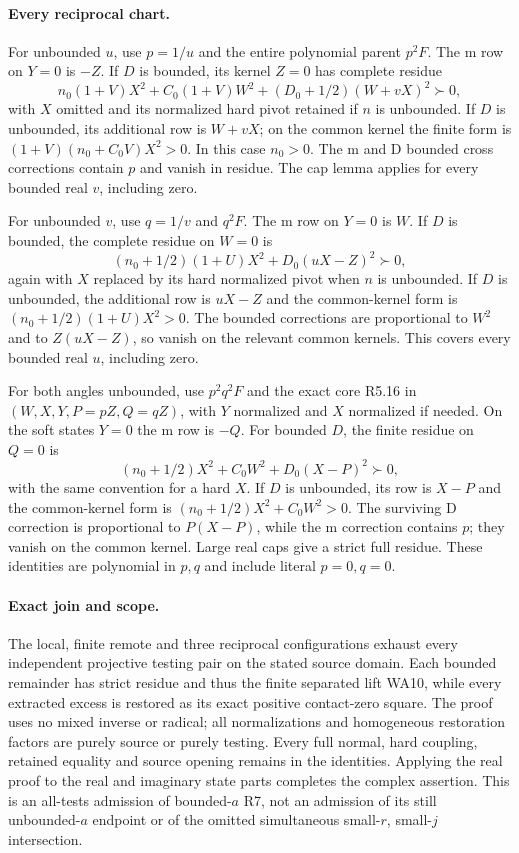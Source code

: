 \paragraph{Every reciprocal chart.}
For unbounded $u$, use $p=1/u$ and the entire polynomial parent $p^2F$.
The m row on $Y=0$ is $-Z$. If $D$ is bounded, its kernel $Z=0$ has
complete residue
\[
 n_0(1+V)X^2+C_0(1+V)W^2+(D_0+1/2)(W+vX)^2\succ0, \tag{R7.10}
\]
with $X$ omitted and its normalized hard pivot retained if $n$ is
unbounded. If $D$ is unbounded, its additional row is $W+vX$; on the
common kernel the finite form is
$(1+V)(n_0+C_0V)X^2>0$. In this case $n_0>0$.
The m and D bounded cross corrections contain $p$ and vanish in residue.
The cap lemma applies for every bounded real $v$, including zero.

For unbounded $v$, use $q=1/v$ and $q^2F$. The m row on $Y=0$ is $W$.
If $D$ is bounded, the complete residue on $W=0$ is
\[
 (n_0+1/2)(1+U)X^2+D_0(uX-Z)^2\succ0,               \tag{R7.11}
\]
again with $X$ replaced by its hard normalized pivot when $n$ is
unbounded. If $D$ is unbounded, the additional row is $uX-Z$ and the
common-kernel form is $(n_0+1/2)(1+U)X^2>0$.
The bounded corrections are proportional to $W^2$ and to $Z(uX-Z)$,
so vanish on the relevant common kernels. This covers every bounded
real $u$, including zero.

For both angles unbounded, use $p^2q^2F$ and the exact core R5.16 in
$(W,X,Y,P=pZ,Q=qZ)$, with $Y$ normalized and $X$ normalized if needed.
On the soft states $Y=0$ the m row is $-Q$. For bounded $D$, the finite
residue on $Q=0$ is
\[
 (n_0+1/2)X^2+C_0W^2+D_0(X-P)^2\succ0,              \tag{R7.12}
\]
with the same convention for a hard $X$. If $D$ is unbounded, its row
is $X-P$ and the common-kernel form is
$(n_0+1/2)X^2+C_0W^2>0$. The surviving D correction is proportional to
$P(X-P)$, while the m correction contains $p$; they vanish on the common
kernel. Large real caps give a strict full residue. These identities
are polynomial in $p,q$ and include literal $p=0,q=0$.

\paragraph{Exact join and scope.}
The local, finite remote and three reciprocal configurations exhaust every
independent projective testing pair on the stated source domain. Each
bounded remainder has strict residue and thus the finite separated lift
WA10, while every extracted excess is restored as its exact positive
contact-zero square. The proof uses no mixed inverse or radical; all
normalizations and homogeneous restoration factors are purely source or
purely testing. Every full normal, hard coupling, retained equality and
source opening remains in the identities. Applying the real proof to the
real and imaginary state parts completes the complex assertion. This is
an all-tests admission of bounded-$a$ R7, not an admission of its still
unbounded-$a$ endpoint or of the omitted simultaneous small-$r$, small-$j$
intersection.
